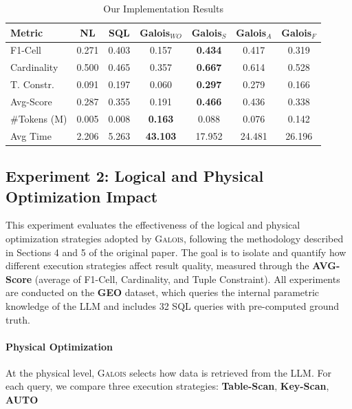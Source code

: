 \begin{table}[H]
    \centering
    \caption{Our Implementation Results}
    \label{tab:galois_our_exp1}
    \begin{tabular}{lcccccc}
        \toprule
        \textbf{Metric} & \textbf{NL} & \textbf{SQL} & \textbf{Galois$_{WO}$} & \textbf{Galois$_S$} & \textbf{Galois$_A$} & \textbf{Galois$_F$} \\
        \midrule
        F1-Cell & 0.271 & 0.403 & 0.157 & \textbf{0.434} & 0.417 & 0.319 \\
        Cardinality & 0.500 & 0.465 & 0.357 & \textbf{0.667} & 0.614 & 0.528 \\
        T. Constr. & 0.091 & 0.197 & 0.060 & \textbf{0.297} & 0.279 & 0.166 \\
        Avg-Score & 0.287 & 0.355 & 0.191 & \textbf{0.466} & 0.436 & 0.338 \\
        \#Tokens (M) & 0.005 & 0.008 & \textbf{0.163} & 0.088 & 0.076 & 0.142 \\
        Avg Time & 2.206 & 5.263 & \textbf{43.103} & 17.952 & 24.481 & 26.196 \\
        \bottomrule
    \end{tabular}
\end{table}

\subsection{Experiment 2: Logical and Physical Optimization Impact}

This experiment evaluates the effectiveness of the logical and physical optimization strategies adopted by \textsc{Galois}, following the methodology described in Sections 4 and 5 of the original paper. The goal is to isolate and quantify how different execution strategies affect result quality, measured through the \textbf{AVG-Score} (average of F1-Cell, Cardinality, and Tuple Constraint). All experiments are conducted on the \textbf{GEO} dataset, which queries the internal parametric knowledge of the LLM and includes 32 SQL queries with pre-computed ground truth.

\paragraph{Physical Optimization}
At the physical level, \textsc{Galois} selects how data is retrieved from the LLM. For each query, we compare three execution strategies: \textbf{Table-Scan}, \textbf{Key-Scan}, \textbf{AUTO}

